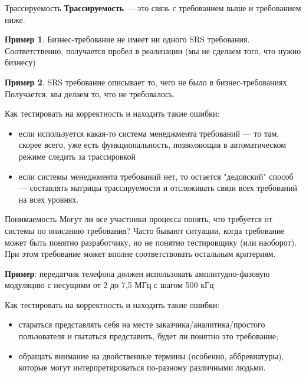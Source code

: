 \documentclass{beamer}
\begin{document}
\begin{frame}[t]{Трассируемость}
\textbf{Трассируемость} — это связь с требованием выше и требованием ниже.

\textbf{Пример 1}. Бизнес-требование не имеет ни одного SRS требования. Соответственно, получается
пробел в реализации (мы не сделаем того, что нужно бизнесу)

\textbf{Пример 2}. SRS требование описывает то, чего не было в бизнес-требованиях. Получается, мы
делаем то, что не требовалось.

Как тестировать на корректность и находить такие ошибки:
\begin{itemize}
\item если используется какая-то система менеджмента требований — то там, скорее
всего, уже есть функциональность, позволяющая в автоматическом режиме
следить за трассировкой
\item если системы менеджмента требований нет, то остается "дедовский" способ —
составлять матрицы трассируемости и отслеживать связи всех
требований на всех уровнях. 
\end{itemize}
\end{frame}

\begin{frame}[t]{Понимаемость}
Могут ли все участники процесса понять, что требуется от системы по описанию
требования? Часто бывают ситуации, когда требование может быть понятно разработчику, но не
понятно тестировщику (или наоборот). При этом требование может вполне
соответствовать остальным критериям.

\textbf{Пример}: передатчик телефона должен использовать амплитудно-фазовую
модуляцию с несущими от 2 до 7,5 МГц с шагом 500 кГц

Как тестировать на корректность и находить такие ошибки:
\begin{itemize}
\item стараться представлять себя на месте заказчика/аналитика/простого
пользователя и пытаться представить, будет ли понятно это требование;
\item обращать внимание на двойственные термины (особенно, аббревиатуры),
которые могут интерпретироваться по-разному различными людьми. 
\end{itemize}
\end{frame}
\end{document}
